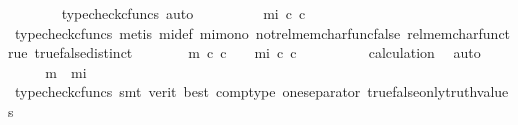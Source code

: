 \begin{isabellebody}
\ \ \ \ \ \ \isamarkupfalse%
\ {\isacharparenleft}{\kern0pt}typecheck{\isacharunderscore}{\kern0pt}cfuncs{\isacharcomma}{\kern0pt}\ auto{\isacharparenright}{\kern0pt}\isanewline
\ \ \ \ \isamarkupfalse%
\ \isamarkupfalse%
\ {\isachardoublequoteopen}{\isachardot}{\kern0pt}{\isachardot}{\kern0pt}{\isachardot}{\kern0pt}\ {\isacharequal}{\kern0pt}\ {\isacharparenleft}{\kern0pt}{\isasymchi}mi\ {\isasymcirc}\isactrlsub c\ c\ {\isacharequal}{\kern0pt}\ {\isasymt}{\isacharparenright}{\kern0pt}{\isachardoublequoteclose}\isanewline
\ \ \ \ \ \ \isamarkupfalse%
\ {\isacharparenleft}{\kern0pt}typecheck{\isacharunderscore}{\kern0pt}cfuncs{\isacharcomma}{\kern0pt}\ metis\ {\isasymchi}mi{\isacharunderscore}{\kern0pt}def\ mi{\isacharunderscore}{\kern0pt}mono\ not{\isacharunderscore}{\kern0pt}rel{\isacharunderscore}{\kern0pt}mem{\isacharunderscore}{\kern0pt}char{\isacharunderscore}{\kern0pt}func{\isacharunderscore}{\kern0pt}false\ rel{\isacharunderscore}{\kern0pt}mem{\isacharunderscore}{\kern0pt}char{\isacharunderscore}{\kern0pt}func{\isacharunderscore}{\kern0pt}true\ true{\isacharunderscore}{\kern0pt}false{\isacharunderscore}{\kern0pt}distinct{\isacharparenright}{\kern0pt}\isanewline
\ \ \ \ \isamarkupfalse%
\ \isamarkupfalse%
\ {\isachardoublequoteopen}{\isacharparenleft}{\kern0pt}{\isasymchi}m\ {\isasymcirc}\isactrlsub c\ c\ {\isacharequal}{\kern0pt}\ {\isasymt}{\isacharparenright}{\kern0pt}\ {\isacharequal}{\kern0pt}\ {\isacharparenleft}{\kern0pt}{\isasymchi}mi\ {\isasymcirc}\isactrlsub c\ c\ {\isacharequal}{\kern0pt}\ {\isasymt}{\isacharparenright}{\kern0pt}{\isachardoublequoteclose}\isanewline
\ \ \ \ \ \ \isamarkupfalse%
\ calculation\ \isamarkupfalse%
\ auto\isanewline
\ \ \isamarkupfalse%
\isanewline
\ \ \isamarkupfalse%
\ \isamarkupfalse%
\ {\isachardoublequoteopen}{\isasymchi}m\ {\isacharequal}{\kern0pt}\ {\isasymchi}mi{\isachardoublequoteclose}\isanewline
\ \ \ \ \isamarkupfalse%
\ {\isacharparenleft}{\kern0pt}typecheck{\isacharunderscore}{\kern0pt}cfuncs{\isacharcomma}{\kern0pt}\ smt\ {\isacharparenleft}{\kern0pt}verit{\isacharcomma}{\kern0pt}\ best{\isacharparenright}{\kern0pt}\ comp{\isacharunderscore}{\kern0pt}type\ one{\isacharunderscore}{\kern0pt}separator\ true{\isacharunderscore}{\kern0pt}false{\isacharunderscore}{\kern0pt}only{\isacharunderscore}{\kern0pt}truth{\isacharunderscore}{\kern0pt}values{\isacharparenright}{\kern0pt}\ \isanewline
\ \ \isamarkupfalse%

\end{isabellebody}
